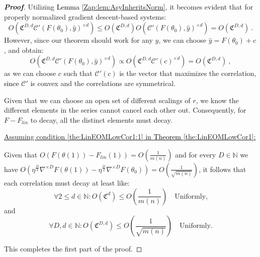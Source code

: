 \documentclass{article} %
\begin{document}
\begin{proof}[\textbf{Proof}]
Utilizing \textcolor{black}{Lemma} \ref{Zap:lem:AsyInheritsNorm}, it becomes evident that for properly normalized gradient descent-based systems:
\begin{equation}
O\left(\mathfrak{C}^{D,d}\mathcal{C}'\left(F\left(\theta_{0}\right),\hat{y}\right)^{\times d}\right)\leq O\left(\mathfrak{C}^{D,d}\right)O\left(\mathcal{C}'\left(F\left(\theta_{0}\right),\hat{y}\right)^{\times d}\right)=O\left(\mathfrak{C}^{D,d}\right) \ .
\end{equation}
However, since our theorem should work for any \(\hat{y}\), we can choose \(\hat{y}=F\left(\theta_{0}\right)+c\), and obtain:
\begin{equation}
O\left(\mathfrak{C}^{D,d}\mathcal{C}'\left(F\left(\theta_{0}\right),\hat{y}\right)^{\times d}\right)
\propto
O\left(\mathfrak{C}^{D,d}\mathcal{C}'\left(c\right)^{\times d}\right)=O\left(\mathfrak{C}^{D,d}\right) \ ,
\end{equation}
as we can choose \(c\) such that \(\mathcal{C}'(c)\) is the vector that maximizes the correlation, \textcolor{black}{since} \(\mathcal{C}'\) is convex and the correlations are symmetrical.

Given that we can choose an open set of different scalings of \(r\), we know the different elements in the series cannot cancel each other out. Consequently, for \(F-F_{lin}\) to decay, all the distinct elements must decay.

\underline{Assuming condition \ref{the:LinEOMLowCor1:1} in \textcolor{black}{Theorem} \ref{the:LinEOMLowCor1}:}

Given that \(O\left(F\left(\theta\left(1\right)\right)-F_{lin}\left(1\right)\right)=O\left(\frac{1}{m\left(n\right)}\right)\) and for every \(D\in\mathbb{N}\) we have
\(O\left(\eta^{\frac{D}{2}}\nabla^{\times D}F\left(\theta\left(1\right)\right)-\eta^{\frac{D}{2}}\nabla^{\times D}F\left(\theta_{0}\right)\right)=O\left(\frac{1}{\sqrt{m\left(n\right)}}\right)\),
it follows that each correlation must decay at least like:
\begin{equation}
\forall 2\leq d\in\mathbb{N}:O\left(\mathfrak{C}^{d}\right)\leq O\left(\frac{1}{m\left(n\right)}\right)\quad \text{Uniformly,} 
\end{equation}
and
\begin{equation}
\forall D,d\in\mathbb{N}:O\left(\mathfrak{C}^{D,d}\right)\leq O\left(\frac{1}{\sqrt{m\left(n\right)}}\right)\quad \text{Uniformly.} 
\end{equation}

This completes the first part of the proof.


\end{proof}
\end{document}
